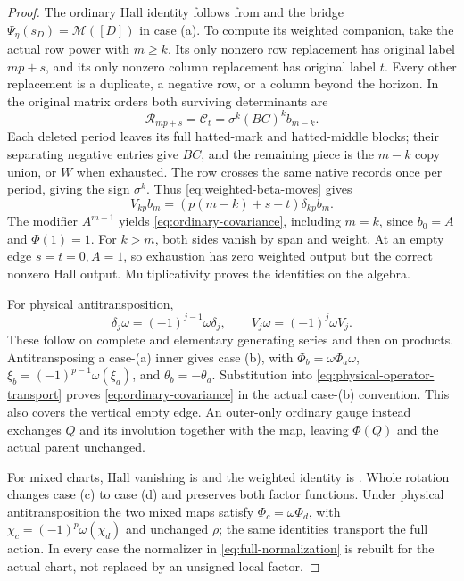\documentclass[11pt,a4paper]{amsart}
\numberwithin{equation}{section}
\theoremstyle{plain}
\theoremstyle{definition}
\begin{document}
\begin{proof}
The ordinary Hall identity follows from  and the bridge \(\Psi_\eta(s_D)=\mathcal M([D])\) in case (a).  To compute its weighted companion, take the actual row power with \(m\ge k\).  Its only nonzero row replacement has original label \(mp+s\), and its only nonzero column replacement has original label \(t\).  Every other replacement is a duplicate, a negative row, or a column beyond the horizon.  In the original matrix orders both surviving determinants are
\[
 \mathcal R_{mp+s}=\mathcal C_t=\sigma^k(BC)^k b_{m-k}.
\]
Each deleted period leaves its full hatted-mark and hatted-middle blocks; their separating negative entries give \(BC\), and the remaining piece is the \(m-k\) copy union, or \(W\) when exhausted.  The row crosses the same native records once per period, giving the sign \(\sigma^k\).  Thus \eqref{eq:weighted-beta-moves} gives
\[
 V_{kp}b_m=(p(m-k)+s-t)\delta_{kp}b_m.
\]
The modifier \(A^{m-1}\) yields \eqref{eq:ordinary-covariance}, including \(m=k\), since \(b_0=A\) and \(\Phi(1)=1\).  For \(k>m\), both sides vanish by span and weight.  At an empty edge \(s=t=0,A=1\), so exhaustion has zero weighted output but the correct nonzero Hall output.  Multiplicativity proves the identities on the algebra.

For physical antitransposition,
\begin{equation}\label{eq:physical-operator-transport}
 \delta_j\omega=(-1)^{j-1}\omega\delta_j,\qquad
 V_j\omega=(-1)^j\omega V_j.
\end{equation}
These follow on complete and elementary generating series and then on products.  Antitransposing a case-(a) inner gives case (b), with
\(\Phi_b=\omega\Phi_a\omega\),
\(\xi_b=(-1)^{p-1}\omega(\xi_a)\), and
\(\theta_b=-\theta_a\).  Substitution into \eqref{eq:physical-operator-transport} proves \eqref{eq:ordinary-covariance} in the actual case-(b) convention.  This also covers the vertical empty edge.  An outer-only ordinary gauge instead exchanges \(Q\) and its involution together with the map, leaving \(\Phi(Q)\) and the actual parent unchanged.

For mixed charts, Hall vanishing is  and the weighted identity is .  Whole rotation changes case (c) to case (d) and preserves both factor functions.  Under physical antitransposition the two mixed maps satisfy \(\Phi_c=\omega\Phi_d\), with \(\chi_c=(-1)^p\omega(\chi_d)\) and unchanged \(\rho\); the same identities transport the full action.  In every case the normalizer in \eqref{eq:full-normalization} is rebuilt for the actual chart, not replaced by an unsigned local factor.
\end{proof}
\end{document}
